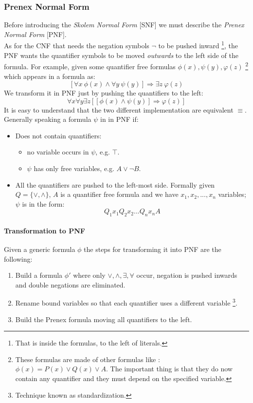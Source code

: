 \documentclass[10pt,a4paper]{article}
\begin{document}
\subsubsection{Prenex Normal Form}
Before introducing the \textit{Skolem Normal Form} [SNF] we must describe the \textit{Prenex Normal Form} [PNF].\\
As for the CNF that needs the negation symbols $\neg$ to be pushed inward \footnote{That is inside the formulas, to the left of literals.}, the PNF wants the quantifier symbols to be moved \textit{outwards} to the left side of the formula. For example, given some quantifier free formulas $\phi(x),\psi(y),\varphi(z)$ \footnote{These formulas are made of other formulas like : $\phi(x)=P(x)\vee Q(x)\vee A$. The important thing is that they do now contain any quantifier and they must depend on the specified variable.  } which appears in a formula as:
\[[\forall x\ \phi(x) \wedge \forall y\ \psi(y)] \Rightarrow \exists z\ \varphi(z)\]
We transform it in PNF just by pushing the quantifiers to the left:
\[\forall x\forall y\exists z[[\phi(x) \wedge \psi(y)] \Rightarrow \varphi(z)]\]
It is easy to understand that the two different implementation are equivalent $\equiv$.\\

Generally speaking a formula $\psi$ in in PNF if:
\begin{itemize}
\item Does not contain quantifiers:
	\begin{itemize}
	\item no variable occurs in $\psi$, e.g. $\top$.
	\item $\psi$ has only free variables, e.g.  $A\vee \neg B$.
	\end{itemize}
\item All the quantifiers are pushed to the left-most side. Formally given $Q=\lbrace \vee, \wedge \rbrace$, $A$ is a quantifier free formula and we have $x_1,x_2,...,x_n$ variables; $\psi$ is in the form:
\[Q_1x_1Q_2x_2...Q_nx_nA\]

\end{itemize}

\paragraph{Transformation to PNF}
Given a generic formula $\phi$ the steps for transforming it into PNF are the following:
\begin{enumerate}
\item Build a formula $\phi'$  where only $\vee, \wedge, \exists, \forall$ occur,  negation is pushed inwards and double negations are eliminated.
\item Rename bound variables so that each quantifier uses a different variable \footnote{Technique known as standardization.}.
\item Build the Prenex formula moving all quantifiers to the left.
\end{enumerate}
\end{document}
